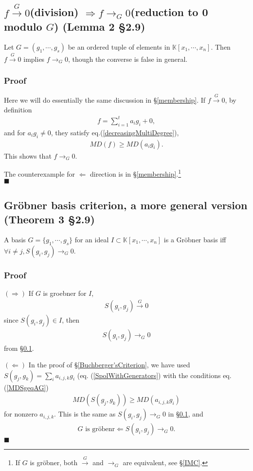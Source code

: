 \documentclass[11pt]{book}
\begin{document}
\subsection{$f \stackrel{G}{\to} 0$(division) $\Rightarrow f \to_G 0$(reduction to 0 modulo $G$) (Lemma 2 \S2.9)}
\label{ModuloR0}
Let $G = (g_1, \cdots, g_s)$ be an ordered tuple of elements in $\mathbb{K}[x_1, \cdots, x_n]$.
Then $f \stackrel{G}{\to} 0$ implies $f \to_G 0$, though the converse is false in general.

\subsubsection{Proof}
Here we will do essentially the same discussion in \S\ref{membership}.
If $f \stackrel{G}{\to} 0$, by definition
\begin{eqnarray}
f = \sum_{i=1}^t a_i g_i + 0,
\end{eqnarray}
and for $a_i g_i \neq 0$, they satisfy eq.(\ref{decreasingMultiDegree}),
\begin{eqnarray}
MD(f) \geq MD(a_i g_i).
\end{eqnarray}
This shows that $f \to_G 0$.

The counterexample for $\Leftarrow$ direction is in \S\ref{membership}.\footnote{If $G$ is gr\"obner, both $\stackrel{G}{\to}$ and $\to_G$ are equivalent, see \S\ref{IMC}.}
\\
$\blacksquare$

\subsection{Gr\"obner basis criterion, a more general version (Theorem 3 \S2.9)}
\label{efficientGCriterion}
A basis $G = \{g_1, \cdots, g_s\}$ for an ideal $I \subset \mathbb{K}[x_1, \cdots, x_n]$ is a Gr\"obner basis iff $\forall i \neq j, S(g_i, g_j) \to_G 0$.

\subsubsection{Proof}
$(\Rightarrow)$ If $G$ is groebner for $I$,
\begin{eqnarray}
S(g_i, g_j) \stackrel{G}{\to} 0
\end{eqnarray}
since $S(g_i, g_j) \in I$, then 
\begin{eqnarray}
S(g_i, g_j) \to_G 0
\end{eqnarray}
from \S\ref{ModuloR0}.

$(\Leftarrow)$
In the proof of \S\ref{Buchberger'sCriterion}, we have used $S(g_j, g_k) = \sum_{i} a_{i,j,k} g_i $ (eq. (\ref{SpolWithGenerators}) with the conditions eq.(\ref{MDSgeqAG})
\begin{eqnarray}
MD\left(S(g_j, g_k) \right) \geq MD( a_{i,j,k} g_i)
\end{eqnarray}
for nonzero $a_{i,j,k}$.
This is the same as $S(g_i, g_j) \to_G 0$ in \S\ref{ModuloR0}, and
\begin{eqnarray}
G \text{ is gr\"obenr} \Leftarrow S(g_i, g_j) \to_G 0.
\end{eqnarray}
$\blacksquare$
\end{document}
